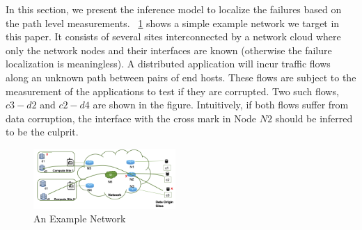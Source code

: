 In this section, we present the inference model to localize the failures based on the path level measurements. 
~\ref{fig:example} shows a simple example network we target in this paper. It consists of several sites interconnected by a network cloud 
where only the network nodes and their interfaces are known (otherwise the failure localization is meaningless). 
A distributed application will incur traffic flows along an unknown path between pairs of end hosts. These flows are subject to 
the measurement of the applications to test if they are corrupted. Two such flows, $c3-d2$ and $c2-d4$ are shown in the figure. Intuitively, 
if both flows suffer from data corruption, the interface with the cross mark in Node $N2$ should be inferred to be the culprit.   

\begin{figure}
  \begin{center}
    \includegraphics[width=0.48\textwidth]{./figure/example_network.png}
  \end{center}
\caption{An Example Network}
\label{fig:example}
\end{figure}

